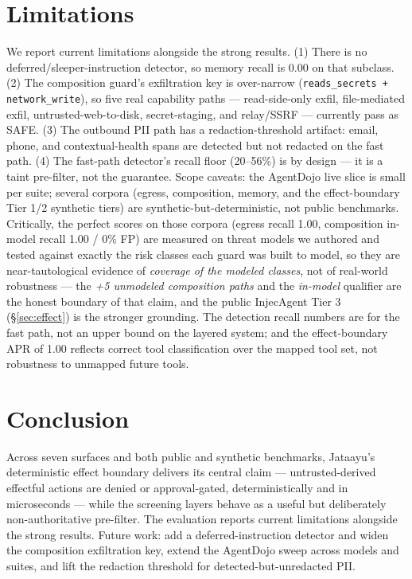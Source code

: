\documentclass[11pt]{article}
\newcommand{\code}[1]{\texttt{\small #1}}
\begin{document}
\section{Limitations}
We report current limitations alongside the strong results. (1) There is no
deferred/sleeper-instruction detector, so memory recall is 0.00 on that subclass. (2) The
composition guard's exfiltration key is over-narrow (\code{reads\_secrets + network\_write}), so
five real capability paths --- read-side-only exfil, file-mediated exfil, untrusted-web-to-disk,
secret-staging, and relay/SSRF --- currently pass as SAFE. (3) The outbound PII path has a
redaction-threshold artifact: email, phone, and contextual-health spans are detected but not
redacted on the fast path. (4) The fast-path detector's recall floor (20--56\%) is by design --- it
is a taint pre-filter, not the guarantee. Scope caveats: the AgentDojo live slice is small per
suite; several corpora (egress, composition, memory, and the effect-boundary Tier 1/2 synthetic
tiers) are synthetic-but-deterministic, not public benchmarks. Critically, the perfect scores on
those corpora (egress recall 1.00, composition in-model recall 1.00 / 0\% FP) are measured on threat
models we authored and tested against exactly the risk classes each guard was built to model, so
they are near-tautological evidence of \emph{coverage of the modeled classes}, not of real-world
robustness --- the \emph{+5 unmodeled composition paths} and the \emph{in-model} qualifier are the
honest boundary of that claim, and the public InjecAgent Tier 3 (\S\ref{sec:effect}) is the stronger
grounding. The detection recall numbers are for the fast path, not an upper bound on the layered
system; and the effect-boundary APR of 1.00 reflects correct tool classification over the mapped
tool set, not robustness to unmapped future tools.

\section{Conclusion}
Across seven surfaces and both public and synthetic benchmarks, Jataayu's deterministic effect
boundary delivers its central claim --- untrusted-derived effectful actions are denied or
approval-gated, deterministically and in microseconds --- while the screening layers behave as a
useful but deliberately non-authoritative pre-filter. The evaluation reports current limitations
alongside the strong results. Future work: add a deferred-instruction detector and widen the
composition exfiltration key, extend the AgentDojo sweep across models and suites, and lift the
redaction threshold for detected-but-unredacted PII.
\end{document}
